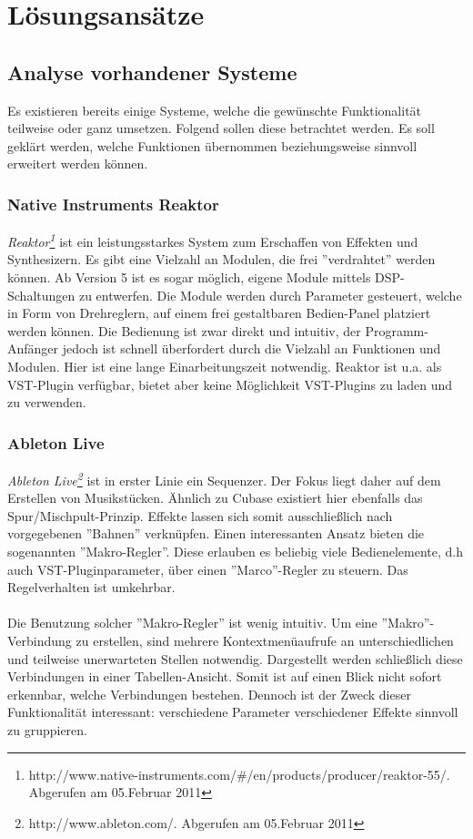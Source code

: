 \section{Lösungsansätze}
\subsection{Analyse vorhandener Systeme}
Es existieren bereits einige Systeme, welche die gewünschte Funktionalität teilweise oder ganz umsetzen. Folgend sollen diese betrachtet werden. Es soll geklärt werden, welche Funktionen übernommen beziehungsweise sinnvoll erweitert werden können.
\subsubsection{Native Instruments Reaktor}
\emph{Reaktor\footnote{http://www.native-instruments.com/\#/en/products/producer/reaktor-55/. \\Abgerufen am 05.Februar 2011}} ist ein leistungsstarkes System zum Erschaffen von Effekten und Synthesizern. Es gibt eine Vielzahl an Modulen, die frei ''verdrahtet'' werden können. Ab Version 5 ist es sogar möglich, eigene Module mittels DSP-Schaltungen zu entwerfen. Die Module werden durch Parameter gesteuert, welche in Form von Drehreglern, auf einem frei gestaltbaren Bedien-Panel platziert werden können. Die Bedienung ist zwar direkt und intuitiv, der Programm-Anfänger jedoch ist schnell überfordert durch die Vielzahl an Funktionen und Modulen. Hier ist eine lange Einarbeitungszeit notwendig. Reaktor ist u.a. als VST-Plugin verfügbar, bietet aber keine Möglichkeit VST-Plugins zu laden und zu verwenden.
\subsubsection{Ableton Live}
\emph{Ableton Live\footnote{http://www.ableton.com/. Abgerufen am 05.Februar 2011}} ist in erster Linie ein Sequenzer. Der Fokus liegt daher auf dem Erstellen von Musikstücken. Ähnlich zu Cubase existiert hier ebenfalls das Spur/Mischpult-Prinzip. Effekte lassen sich somit ausschließlich nach vorgegebenen ''Bahnen'' verknüpfen. Einen interessanten Ansatz bieten die sogenannten ''Makro-Regler''. Diese erlauben es beliebig viele Bedienelemente, d.h auch VST-Pluginparameter, über einen ''Marco''-Regler zu steuern. Das Regelverhalten ist umkehrbar. 
\\\\
Die Benutzung solcher ''Makro-Regler'' ist wenig intuitiv. Um eine ''Makro''-Verbindung zu erstellen, sind mehrere Kontextmenüaufrufe an unterschiedlichen und teilweise unerwarteten Stellen notwendig. 
Dargestellt werden schließlich diese Verbindungen in einer Tabellen-Ansicht. Somit ist auf einen Blick nicht sofort erkennbar, welche Verbindungen bestehen. Dennoch ist der Zweck dieser Funktionalität interessant:  verschiedene Parameter verschiedener Effekte sinnvoll zu gruppieren.  
